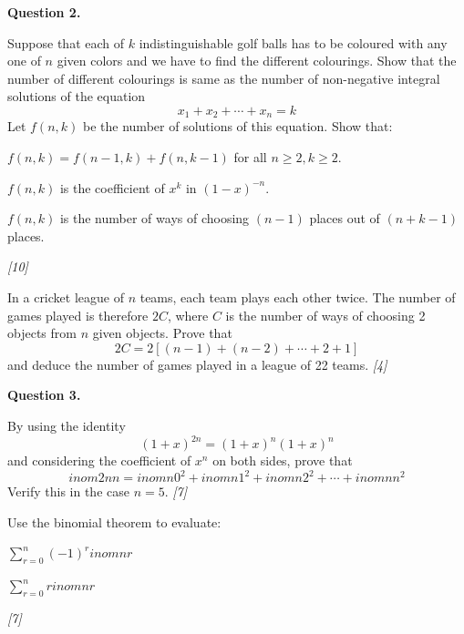 \documentclass[11pt,a4paper]{article}
\newcommand{\pts}[1]{\hfill   \textit{[#1]}}
\begin{document}
\medskip


\noindent   \textbf{Question 2.}

\begin{parts}
  \item Suppose that each of $k$ indistinguishable golf balls has to be coloured with any one of $n$ given colors and we have to find the different colourings. Show that the number of different colourings is same as the number of non-negative integral solutions of the equation
  \[ x_1 + x_2 + \cdots + x_n = k \]
  Let $f(n,k)$ be the number of solutions of this equation. Show that:
  
\begin{parts}
    \item $f(n,k) = f(n-1,k) + f(n,k-1)$ for all $n \ge 2, k \ge 2$.
    \item $f(n,k)$ is the coefficient of $x^k$ in $(1-x)^{-n}$.
    \item $f(n,k)$ is the number of ways of choosing $(n-1)$ places out of $(n+k-1)$ places.
  \end{parts} \pts{10}
  \item In a cricket league of $n$ teams, each team plays each other twice. The number of games played is therefore $2C$, where $C$ is the number of ways of choosing 2 objects from $n$ given objects. Prove that
  \[ 2C = 2\left[ (n-1)+(n-2)+\cdots+2+1 \right] \]
  and deduce the number of games played in a league of 22 teams. \pts{4}
\end{parts}

\medskip


\noindent   \textbf{Question 3.}

\begin{parts}
  \item By using the identity
  \[ (1+x)^{2n} = (1+x)^n(1+x)^n \]
  and considering the coefficient of $x^n$ on both sides, prove that
  \[ inom{2n}{n} = inom{n}{0}^2 + inom{n}{1}^2 + inom{n}{2}^2 + \cdots + inom{n}{n}^2 \]
  Verify this in the case $n=5$. \pts{7}
  \item Use the binomial theorem to evaluate:
  
\begin{parts}
    \item $\sum_{r=0}^{n} (-1)^r inom{n}{r}$
    \item $\sum_{r=0}^{n} r inom{n}{r}$
  \end{parts} \pts{7}
\end{parts}

\medskip
\end{document}

